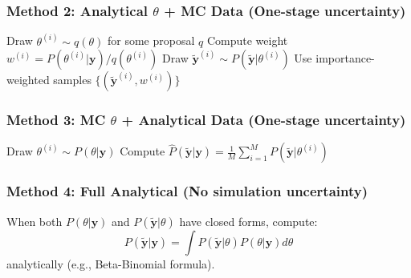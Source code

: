 \subsubsection*{Method 2: Analytical $\theta$ + MC Data (One-stage uncertainty)}
\begin{algorithmbox}
\begin{algorithm}[H]
\begin{algorithmic}[1]
    \State Draw $\theta^{(i)} \sim q(\theta)$ for some proposal $q$
    \State Compute weight $w^{(i)} = P(\theta^{(i)}|\mathbf{y})/q(\theta^{(i)})$ 
    \State Draw $\tilde{\mathbf{y}}^{(i)} \sim P(\tilde{\mathbf{y}}|\theta^{(i)})$ 
\EndFor
\State Use importance-weighted samples $\{(\tilde{\mathbf{y}}^{(i)}, w^{(i)})\}$
\end{algorithmic}
\end{algorithm}
\end{algorithmbox}

\subsubsection*{Method 3: MC $\theta$ + Analytical Data (One-stage uncertainty)}
\begin{algorithmbox}
\begin{algorithm}[H]
\begin{algorithmic}[1]
    \State Draw $\theta^{(i)} \sim P(\theta|\mathbf{y})$ 
\EndFor
{}
    \State Compute $\hat{P}(\tilde{\mathbf{y}}|\mathbf{y}) = \frac{1}{M}\sum_{i=1}^M P(\tilde{\mathbf{y}}|\theta^{(i)})$ 
\EndFor
\end{algorithmic}
\end{algorithm}
\end{algorithmbox}

\subsubsection*{Method 4: Full Analytical (No simulation uncertainty)}
\begin{algorithmbox}
\begin{algorithm}[H]
\caption{Analytical predictive distribution}
\begin{algorithmic}[1]
\State When both $P(\theta|\mathbf{y})$ and $P(\tilde{\mathbf{y}}|\theta)$ have closed forms, compute:
\State \[
P(\tilde{\mathbf{y}}|\mathbf{y}) = \int P(\tilde{\mathbf{y}}|\theta) P(\theta|\mathbf{y}) d\theta
\]
\State analytically (e.g., Beta-Binomial formula).
\end{algorithmic}
\end{algorithm}
\end{algorithmbox}

